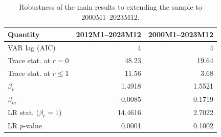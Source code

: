\begin{table}[H]
\centering
\caption{Robustness of the main results to extending the sample to 2000M1--2023M12.}
\label{tab:robustness}
\begin{tabular}{lrr}
\toprule
Quantity & 2012M1--2023M12 & 2000M1--2023M12 \\
\midrule
VAR lag (AIC) & 4 & 4 \\
Trace stat. at $r=0$ & 48.23 & 19.64 \\
Trace stat. at $r\leq 1$ & 11.56 & 3.68 \\
$\beta_r$ & 1.4918 & 1.5521 \\
$\beta_m$ & 0.0085 & 0.1719 \\
LR stat. ($\beta_r=1$) & 14.4616 & 2.7022 \\
LR $p$-value & 0.0001 & 0.1002 \\
\bottomrule
\end{tabular}
\end{table}
